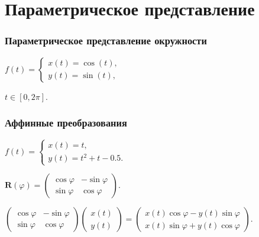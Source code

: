 \documentclass[10pt]{beamer}
\begin{document}
\section{Параметрическое представление}
\frame{\sectionpage}

\begin{frame}\frametitle{Параметрическое представление окружности}
	{
		
		$
		f(t)=
		\begin{cases}
			x(t)=\cos(t),\\
			y(t)=\sin(t),
		\end{cases}
		$
		
		$
		t \in [0, 2\pi].
		$
		
	}{
	}
		
	
\end{frame}

\begin{frame}\frametitle{Аффинные преобразования}
	
	{
	}{
		$
		f(t)=
		\begin{cases}
			x(t)=t,\\
			y(t)=t^2+t-0.5.
		\end{cases}
		$
		
		\vspace{2ex}
		
		$
		\mathbf R(\varphi)=
		\begin{pmatrix}
			\cos\varphi & -\sin\varphi \\
			\sin\varphi &  \cos\varphi
		\end{pmatrix}.
		$
		
		\vspace{2ex}	

	}
	{
		
	}{
	
	$
	\begin{pmatrix}
		\cos\varphi & -\sin\varphi \\
		\sin\varphi &  \cos\varphi
	\end{pmatrix}
	\begin{pmatrix}
		x(t)\\
		y(t)
	\end{pmatrix}
	=
	\begin{pmatrix}
		x(t)\cos\varphi - y(t)\sin\varphi  \\
		x(t)\sin\varphi  + y(t)\cos\varphi
	\end{pmatrix}.
	$
		
	}
	

	
\end{frame}
\end{document}
